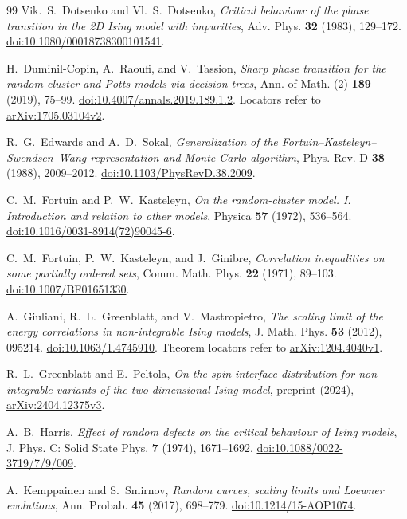 \begin{thebibliography}{99}
Vik.~S.~Dotsenko and Vl.~S.~Dotsenko,
\emph{Critical behaviour of the phase transition in the 2D Ising model with impurities},
Adv. Phys. \textbf{32} (1983), 129--172.
\href{https://doi.org/10.1080/00018738300101541}{doi:10.1080/00018738300101541}.

H.~Duminil-Copin, A.~Raoufi, and V.~Tassion,
\emph{Sharp phase transition for the random-cluster and Potts models via decision trees},
Ann. of Math. (2) \textbf{189} (2019), 75--99.
\href{https://doi.org/10.4007/annals.2019.189.1.2}{doi:10.4007/\allowbreak annals.2019.189.1.2}.
Locators refer to \href{https://arxiv.org/abs/1705.03104v2}{arXiv:1705.03104v2}.

R.~G.~Edwards and A.~D.~Sokal,
\emph{Generalization of the Fortuin--Kasteleyn--Swendsen--Wang representation and Monte Carlo algorithm},
Phys. Rev. D \textbf{38} (1988), 2009--2012.
\href{https://doi.org/10.1103/PhysRevD.38.2009}{doi:10.1103/PhysRevD.38.2009}.

C.~M.~Fortuin and P.~W.~Kasteleyn,
\emph{On the random-cluster model. I. Introduction and relation to other models},
Physica \textbf{57} (1972), 536--564.
\href{https://doi.org/10.1016/0031-8914(72)90045-6}{doi:10.1016/0031-8914(72)90045-6}.

C.~M.~Fortuin, P.~W.~Kasteleyn, and J.~Ginibre,
\emph{Correlation inequalities on some partially ordered sets},
Comm. Math. Phys. \textbf{22} (1971), 89--103.
\href{https://doi.org/10.1007/BF01651330}{doi:10.1007/BF01651330}.

A.~Giuliani, R.~L.~Greenblatt, and V.~Mastropietro,
\emph{The scaling limit of the energy correlations in non-integrable Ising models},
J. Math. Phys. \textbf{53} (2012), 095214.
\href{https://doi.org/10.1063/1.4745910}{doi:10.1063/1.4745910}.
Theorem locators refer to \href{https://arxiv.org/abs/1204.4040v1}{arXiv:1204.4040v1}.

R.~L.~Greenblatt and E.~Peltola,
\emph{On the spin interface distribution for non-integrable variants of the two-dimensional Ising model},
preprint (2024), \href{https://arxiv.org/abs/2404.12375v3}{arXiv:2404.12375v3}.

A.~B.~Harris,
\emph{Effect of random defects on the critical behaviour of Ising models},
J. Phys. C: Solid State Phys. \textbf{7} (1974), 1671--1692.
\href{https://doi.org/10.1088/0022-3719/7/9/009}{doi:10.1088/0022-3719/7/9/009}.

A.~Kemppainen and S.~Smirnov,
\emph{Random curves, scaling limits and Loewner evolutions},
Ann. Probab. \textbf{45} (2017), 698--779.
\href{https://doi.org/10.1214/15-AOP1074}{doi:10.1214/15-AOP1074}.


\end{thebibliography}
